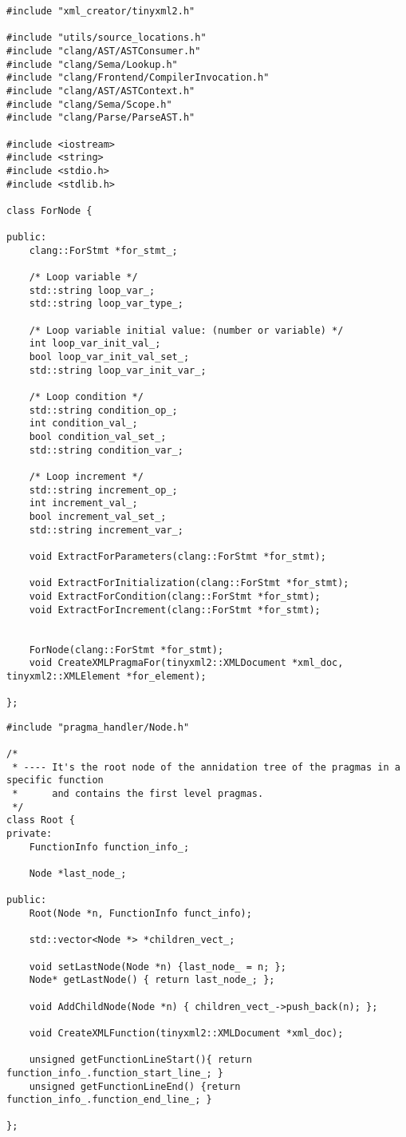 \documentclass[a4paper,10pt,twoside]{book}
\begin{document}
\begin{lstlisting}[language=CCC, caption=pragma\_handler/ForNode.h]
#include "xml_creator/tinyxml2.h"

#include "utils/source_locations.h"
#include "clang/AST/ASTConsumer.h"
#include "clang/Sema/Lookup.h"
#include "clang/Frontend/CompilerInvocation.h"
#include "clang/AST/ASTContext.h"
#include "clang/Sema/Scope.h"
#include "clang/Parse/ParseAST.h"

#include <iostream>
#include <string>
#include <stdio.h>
#include <stdlib.h>

class ForNode {

public:
	clang::ForStmt *for_stmt_;

	/* Loop variable */
	std::string loop_var_;
	std::string loop_var_type_;

	/* Loop variable initial value: (number or variable) */
	int loop_var_init_val_;
	bool loop_var_init_val_set_;
	std::string loop_var_init_var_;

	/* Loop condition */
	std::string condition_op_;
	int condition_val_;
	bool condition_val_set_;
	std::string condition_var_;

	/* Loop increment */
	std::string increment_op_;
	int increment_val_;
	bool increment_val_set_;
	std::string increment_var_;

	void ExtractForParameters(clang::ForStmt *for_stmt);

	void ExtractForInitialization(clang::ForStmt *for_stmt);
	void ExtractForCondition(clang::ForStmt *for_stmt);
	void ExtractForIncrement(clang::ForStmt *for_stmt);


	ForNode(clang::ForStmt *for_stmt);
	void CreateXMLPragmaFor(tinyxml2::XMLDocument *xml_doc, tinyxml2::XMLElement *for_element);

};
\end{lstlisting}

\begin{lstlisting}[language=CCC, caption=pragma\_handler/Root.h]
#include "pragma_handler/Node.h"

/*
 * ---- It's the root node of the annidation tree of the pragmas in a specific function 
 * 		and contains the first level pragmas.
 */
class Root {
private:	
	FunctionInfo function_info_;

	Node *last_node_;

public:
	Root(Node *n, FunctionInfo funct_info);

	std::vector<Node *> *children_vect_;

	void setLastNode(Node *n) {last_node_ = n; };
	Node* getLastNode() { return last_node_; };

	void AddChildNode(Node *n) { children_vect_->push_back(n); };

	void CreateXMLFunction(tinyxml2::XMLDocument *xml_doc);

	unsigned getFunctionLineStart(){ return function_info_.function_start_line_; }
	unsigned getFunctionLineEnd() {return function_info_.function_end_line_; }

};
\end{lstlisting}
\end{document}
